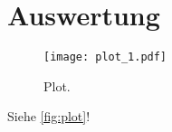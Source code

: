 \section{Auswertung}
\label{sec:Auswertung}

\begin{figure}
  \centering
  \texttt{[image: plot\_1.pdf]}
  \caption{Plot.}
  \label{fig:plot}
\end{figure}


Siehe \autoref{fig:plot}!
